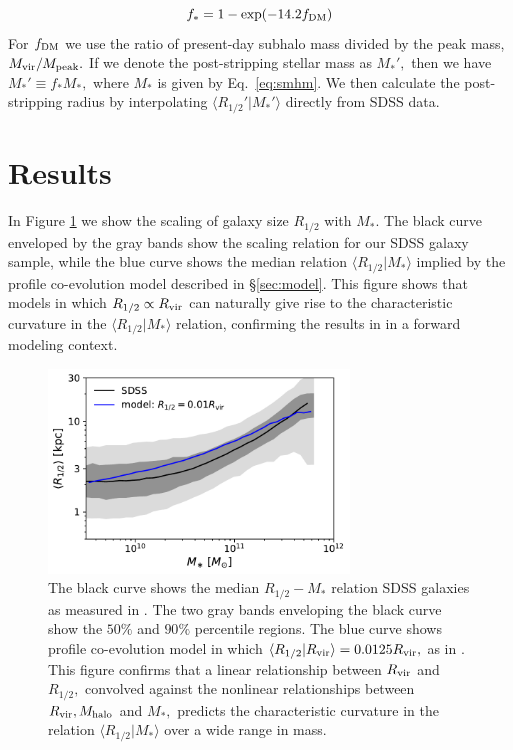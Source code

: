 \documentclass[usenatbib,usegraphicx,letterpaper]{mn2e}
\newcommand{\beq}{\begin{equation}}
\newcommand{\eeq}{\end{equation}}
\newcommand{\rhalf}{R_{1/2}}
\newcommand{\mstar}{M_{\ast}}
\newcommand{\mhalo}{M_{\rm halo}}
\newcommand{\rvir}{R_{\rm vir}}
\begin{document}
\beq
f_{\ast} = 1 - \exp(-14.2f_{\rm DM})
\eeq
For $f_{\rm DM}$ we use the ratio of present-day subhalo mass divided by the peak mass, $M_{\rm vir}/M_{\rm peak}.$ If we denote the post-stripping stellar mass as $M_{\ast}',$ then we have $M_{\ast}'\equiv f_{\ast}M_{\ast},$ where $M_{\ast}$ is given by Eq.~\ref{eq:smhm}. We then calculate the post-stripping radius by interpolating $\langle\rhalf'\vert\mstar'\rangle$ directly from SDSS data.

\section{Results}
\label{sec:results}

In Figure \ref{fig:scatter_plot} we show the scaling of galaxy size $\rhalf$ with $\mstar.$ The black curve enveloped by the gray bands show the scaling relation for our SDSS galaxy sample, while the blue curve shows the median relation $\langle\rhalf\vert\mstar\rangle$ implied by the profile co-evolution model described in \S\ref{sec:model}. This figure shows that models in which $\rhalf\propto\rvir$ can naturally give rise to the characteristic curvature in the $\langle\rhalf\vert\mstar\rangle$ relation, confirming the results in \citet{kravtsov13} in a forward modeling context.

\begin{figure}
\centering
\includegraphics[width=8cm]{FIGS/rvir_only_rhalf_vs_mstar_sham_model.pdf}
\caption{
The black curve shows the median $\rhalf-\mstar$ relation SDSS galaxies as measured in \citet{meert_etal15}. The two gray bands enveloping the black curve show the $50\%$ and $90\%$ percentile regions. The blue curve shows profile co-evolution model in which $\langle\rhalf\vert\rvir\rangle=0.0125\rvir,$ as in \citet{kravtsov13}. This figure confirms that a linear relationship between $\rvir$ and $\rhalf,$ convolved against the nonlinear relationships between $\rvir, \mhalo$ and $\mstar,$  predicts the characteristic curvature in the relation $\langle\rhalf\vert\mstar\rangle$ over a wide range in mass.
}
\label{fig:scatter_plot}
\end{figure}
\end{document}
